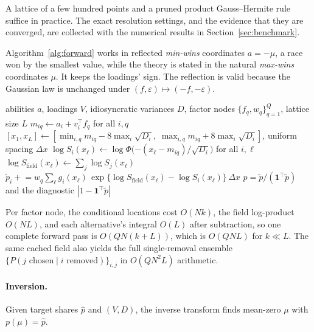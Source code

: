 \documentclass[12pt]{article}
\theoremstyle{remark}
\begin{document}
A lattice of a few hundred points and a pruned product Gauss--Hermite
rule suffice in practice. The exact resolution settings, and the
evidence that they are converged, are collected with the numerical
results in Section~\ref{sec:benchmark}.

Algorithm~\ref{alg:forward} works in reflected \emph{min-wins}
coordinates $a = -\mu$, a race won by the smallest value, while the
theory is stated in the natural \emph{max-wins} coordinates $\mu$. It
keeps the loadings' sign. The reflection is valid
because the Gaussian law is unchanged under $(f, \varepsilon) \mapsto
(-f, -\varepsilon)$.

\begin{algorithm}[H]
\caption{All-share forward pass (min-wins; reflected from argmax by $a = -\mu$)}
\label{alg:forward}
\begin{algorithmic}[1]
\Require abilities $a$, loadings $V$, idiosyncratic variances $D$, factor
nodes $\{f_q, w_q\}_{q=1}^{Q}$, lattice size $L$
\State $m_{iq} \gets a_i + v_i^\top f_q$ for all $i, q$
\State $[x_1, x_L] \gets [\min_{i,q} m_{iq} - 8\max_i \sqrt{D_i},\;
\max_{i,q} m_{iq} + 8\max_i \sqrt{D_i}]$, uniform spacing $\Delta x$
  \State $\log S_i(x_\ell) \gets \log\Phi\big({-(x_\ell -
  m_{iq})}/{\sqrt{D_i}}\big)$ for all $i, \ell$
  \State $\log S_{\mathrm{field}}(x_\ell) \gets \sum_j \log
  S_j(x_\ell)$
  \State $\tilde p_i \mathrel{+}= w_q \sum_\ell g_i(x_\ell)\,
  \exp\{\log S_{\mathrm{field}}(x_\ell) - \log S_i(x_\ell)\}\,
  \Delta x$ 
\EndFor
\State \Return $p = \tilde p / (\mathbf{1}^\top \tilde p)$ and the
diagnostic $|1 - \mathbf{1}^\top \tilde p|$
\end{algorithmic}
\end{algorithm}

Per factor node, the conditional
locations cost $O(Nk)$, the field log-product $O(NL)$, and each
alternative's integral $O(L)$ after subtraction, so one complete forward
pass is $O(QN(k+L))$, which is $O(QNL)$ for $k \ll L$. The same cached
field also yields the full single-removal ensemble $\{P(j \text{ chosen}
\mid i \text{ removed})\}_{i,j}$ in $O(QN^2L)$ arithmetic.

\paragraph{Inversion.} Given target shares $\hat p$ and $(V, D)$, the
inverse transform finds mean-zero $\mu$ with $p(\mu) = \hat p$.
\end{document}
